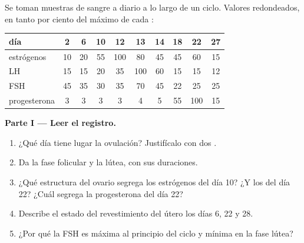 \begin{problem}
\label{pb:g11:hormones-and-reproduction:1}
Se toman muestras de sangre a diario a lo largo de un ciclo. Valores
redondeados, en tanto por ciento del máximo de cada :

\begin{center}
\begin{tabular}{lccccccccc}
día & 2 & 6 & 10 & 12 & 13 & 14 & 18 & 22 & 27 \\ \hline
estrógenos & 10 & 20 & 55 & 100 & 80 & 45 & 45 & 60 & 15 \\
LH & 15 & 15 & 20 & 35 & 100 & 60 & 15 & 15 & 12 \\
FSH & 45 & 35 & 30 & 35 & 70 & 45 & 22 & 25 & 25 \\
progesterona & 3 & 3 & 3 & 3 & 4 & 5 & 55 & 100 & 15 \\
\end{tabular}
\end{center}

\medskip
\noindent\textbf{Parte I --- Leer el registro.}
\begin{enumerate}
  \item ¿Qué día tiene lugar la ovulación? Justifícalo con dos
        .
  \item Da la fase folicular y la lútea, con sus duraciones.
  \item ¿Qué estructura del ovario segrega los estrógenos del día 10?
        ¿Y los del día 22? ¿Cuál segrega la progesterona del día 22?
  \item Describe el estado del revestimiento del útero los días 6, 22 y
        28.
  \item ¿Por qué la FSH es máxima al principio del ciclo y mínima en la
        fase lútea?
\end{enumerate}


\end{problem}
